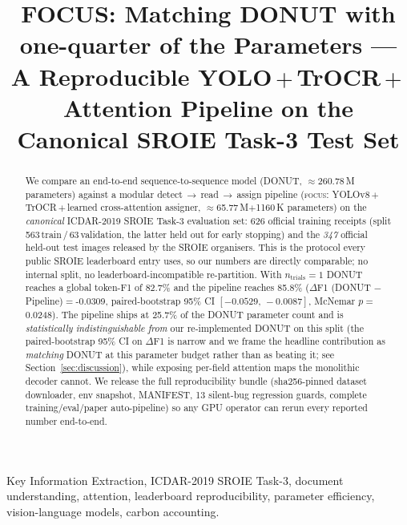 \documentclass[conference]{IEEEtran}
\begin{document}
\title{FOCUS: Matching DONUT with one-quarter of the Parameters
       --- A Reproducible YOLO\,$+$\,TrOCR\,$+$\,Attention Pipeline
       on the Canonical SROIE Task-3 Test Set}

\author{
}

\maketitle

\begin{IEEEkeywords}
Key Information Extraction, ICDAR-2019 SROIE Task-3,
document understanding, attention, leaderboard reproducibility,
parameter efficiency, vision-language models, carbon accounting.
\end{IEEEkeywords}

\begin{abstract}
We compare an end-to-end sequence-to-sequence model
(DONUT, $\approx$260.78\,M parameters) against a modular
detect\,$\to$\,read\,$\to$\,assign pipeline (\textsc{focus}:
YOLOv8\,$+$\,TrOCR\,$+$\,learned cross-attention assigner,
$\approx$65.77\,M$+$1160\,K
parameters) on the
\emph{canonical} ICDAR-2019 SROIE Task-3 evaluation set: 626
official training receipts (split
563\,train\,/\,63\,validation, the
latter held out for early stopping) and the
\emph{347} official held-out test images released by
the SROIE organisers.  This is the protocol every public SROIE
leaderboard entry uses, so our numbers are directly comparable; no
internal split, no leaderboard-incompatible re-partition.  With
$n_{\text{trials}}=1$ DONUT reaches a global token-F1
of 82.7\% and the pipeline reaches
85.8\%
($\Delta$F1 (DONUT $-$ Pipeline)$=$-0.0309, paired-bootstrap
95\% CI $[-0.0529,\,-0.0087]$, McNemar
$p=$0.0248).  The pipeline ships at
25.7\% of the DONUT parameter count and is
\emph{statistically indistinguishable from} our re-implemented DONUT
on this split (the paired-bootstrap 95\% CI on $\Delta$F1 is narrow
and we frame the headline contribution as \emph{matching} DONUT at
this parameter budget rather than as beating it; see
Section~\ref{sec:discussion}), while exposing per-field attention
maps the monolithic decoder cannot.  We release the full
reproducibility bundle (sha256-pinned dataset downloader, env
snapshot, MANIFEST, 13 silent-bug regression guards, complete
training/eval/paper auto-pipeline) so any GPU operator can rerun
every reported number end-to-end.
\end{abstract}
\end{document}
